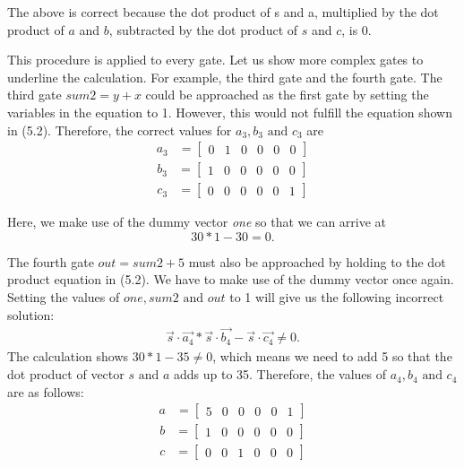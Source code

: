 The above is correct because the dot product of s and a, multiplied by the dot product of \(a\) and \(b\), subtracted by the dot product of \(s\) and \(c\), is 0.

This procedure is applied to every gate. Let us show more complex gates to underline the calculation. For example, the third gate and the fourth gate. The third gate \(sum2=y+x\) could be approached as the first gate by setting the variables in the equation to 1. However, this would not fulfill the equation shown in (5.2). Therefore, the correct values for \(a_3, b_3 \text{ and }c_3\) are
\begin{align*}
    a_3 &=\begin{bmatrix}
        0 & 1 & 0 & 0 & 0 & 0
    \end{bmatrix}
\end{align*}
\begin{align*}
    b_3&=\begin{bmatrix}
        1 & 0 & 0 & 0 & 0 & 0 
    \end{bmatrix}
\end{align*}
\begin{align*}
    c_3&=\begin{bmatrix}
        0 & 0 & 0 & 0 & 0 & 1
    \end{bmatrix}
\end{align*}

Here, we make use of the dummy vector \textit{one} so that we can arrive at 
\[30 * 1 - 30 = 0.\]

The fourth gate \(out=sum2+5\) must also be approached by holding to the dot product equation in (5.2). We have to make use of the dummy vector once again. Setting the values of \(one, sum2 \text{ and } out\)  to 1 will give us the following incorrect solution:
\begin{align*}
     \Vec{s}\cdot\Vec{a_4} * \Vec{s}\cdot\Vec{b_4} - \Vec{s}\cdot\Vec{c_4} \neq 0.
\end{align*}
The calculation shows \(30 * 1 - 35 \neq 0\), which means we need to add 5 so that the dot product of vector \(s \text{ and } a\) adds up to 35. Therefore, the values of \(a_4, b_4 \text{ and }c_4\) are as follows:
\begin{align*}
    a &=\begin{bmatrix}
        5 & 0 & 0 & 0 & 0 & 1
    \end{bmatrix}
\end{align*}
\begin{align*}
    b&=\begin{bmatrix}
        1 & 0 & 0 & 0 & 0 & 0 
    \end{bmatrix}
\end{align*}
\begin{align*}
    c&=\begin{bmatrix}
        0 & 0 & 1 & 0 & 0 & 0
    \end{bmatrix}
\end{align*}

